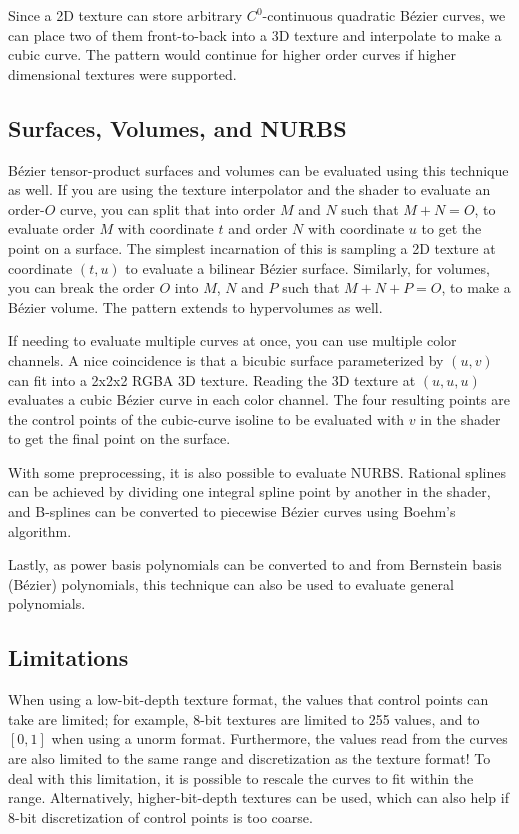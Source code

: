\documentclass{jcgt}
\begin{document}
Since a 2D texture can store arbitrary $C^0$-continuous quadratic Bézier curves, we can place two of them front-to-back into a 3D texture and interpolate to make a cubic curve. The pattern would
continue for higher order curves if higher dimensional textures were supported.

\subsection{Surfaces, Volumes, and NURBS}

Bézier tensor-product surfaces and volumes can be evaluated using this technique as well. If you are using the texture interpolator and the shader to evaluate an order-$O$ curve, you can split
that into order $M$ and $N$ such that $M+N=O$, to evaluate order $M$ with coordinate $t$ and order $N$ with coordinate $u$ to get the point on a surface.  The simplest incarnation of this
is sampling a 2D texture at coordinate $(t, u)$ to evaluate a bilinear Bézier surface. Similarly, for volumes, you can break the order $O$ into $M$, $N$ and $P$ such that $M+N+P=O$, to make
a Bézier volume. The pattern extends to hypervolumes as well.

If needing to evaluate multiple curves at once, you can use multiple color channels. A nice coincidence is that a bicubic surface parameterized by $(u,v)$ can fit into a 2x2x2 RGBA 3D texture.
Reading the 3D texture at $(u,u,u)$ evaluates a cubic Bézier curve in each color channel. The four resulting points are the control points of the cubic-curve isoline to be evaluated with $v$ in
the shader to get the final point on the surface.

With some preprocessing, it is also possible to evaluate NURBS. Rational splines can be achieved by dividing one integral spline point by another in the shader, and B-splines can be converted
to piecewise Bézier curves using Boehm's algorithm.

Lastly, as power basis polynomials can be converted to and from Bernstein basis (Bézier) polynomials, this technique can also be used to evaluate general polynomials.

\subsection{Limitations}



When using a low-bit-depth texture format, the values that control points can take are limited; for example, 8-bit textures are limited to 255 values, and to $[0,1]$ when using
a unorm format. Furthermore, the values read from the curves are also limited to the same range and discretization as the texture format! To deal with this limitation, it is possible to
rescale the curves to fit within the range. Alternatively, higher-bit-depth textures can be used, which can also help if 8-bit discretization of control points is too coarse.
\end{document}
